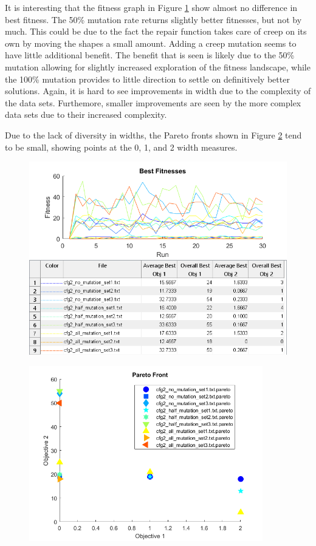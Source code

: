 \documentclass[11pt]{article}
\begin{document}
It is interesting that the fitness graph in Figure \ref{fig:cfg2_best} show almost no difference in best fitness. The 50\% mutation rate returns slightly better fitnesses, but not by much. This could be due to the fact the repair function takes care of creep on its own by moving the shapes a small amount. Adding a creep mutation seems to have little additional benefit. The benefit that is seen is likely due to the 50\% mutation allowing for slightly increased exploration of the fitness landscape, while the 100\% mutation provides to little direction to settle on definitively better solutions. Again, it is hard to see improvements in width due to the complexity of the data sets. Furthemore, smaller improvements are seen by the more complex data sets due to their increased complexity.

Due to the lack of diversity in widths, the Pareto fronts shown in Figure \ref{fig:cfg2_pareto} tend to be small, showing points at the 0, 1, and 2 width measures.

\begin{figure}[H]
	\centering
  \includegraphics[width=5in]{assn1d_cfg2_bestfitness.png}
  \label{fig:cfg2_best}
\end{figure}

\begin{figure}[H]
	\centering
  \includegraphics[width=4in]{assn1d_cfg2_pareto.png}
  \label{fig:cfg2_pareto}
\end{figure}
\end{document}
